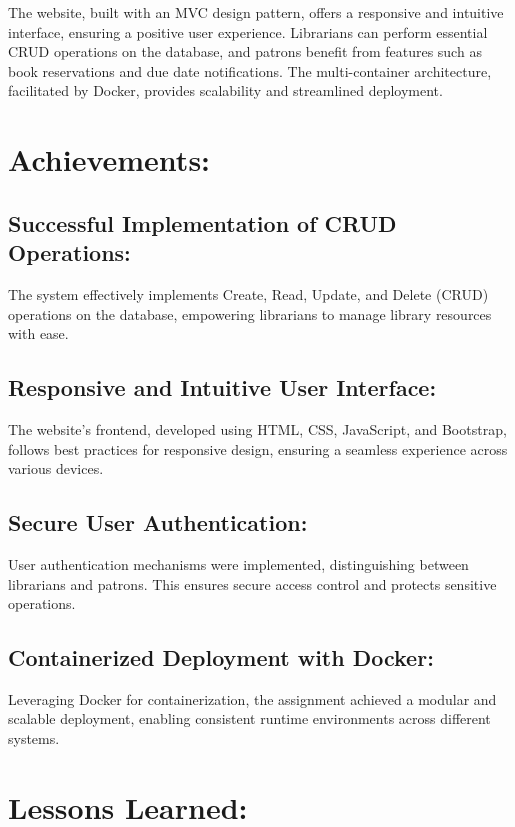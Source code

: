\documentclass[12pt,titlepage,a4paper]{report}
\begin{document}
The website, built with an MVC design pattern, offers a responsive and intuitive interface, ensuring a positive user experience. Librarians can perform essential CRUD operations on the database, and patrons benefit from features such as book reservations and due date notifications. The multi-container architecture, facilitated by Docker, provides scalability and streamlined deployment.

\section{Achievements:}

\subsection{Successful Implementation of CRUD Operations:}
\noindent
The system effectively implements Create, Read, Update, and Delete (CRUD) operations on the database, empowering librarians to manage library resources with ease.

\subsection{Responsive and Intuitive User Interface:}
\noindent
The website's frontend, developed using HTML, CSS, JavaScript, and Bootstrap, follows best practices for responsive design, ensuring a seamless experience across various devices.

\subsection{Secure User Authentication:}
\noindent
User authentication mechanisms were implemented, distinguishing between librarians and patrons. This ensures secure access control and protects sensitive operations.

\subsection{Containerized Deployment with Docker:}
\noindent
Leveraging Docker for containerization, the assignment achieved a modular and scalable deployment, enabling consistent runtime environments across different systems.

\section{Lessons Learned:}
\end{document}
